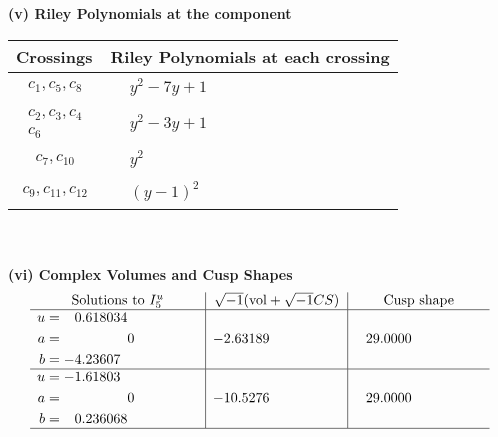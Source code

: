 \documentclass[1p]{elsarticle_modified}
\theoremstyle{definition}
\newcommand{\I}{\sqrt{-1}}
\begin{document}
\newpage\renewcommand{\arraystretch}{1}
\flushleft \textbf{(v) Riley Polynomials at the component}\newline \\
\begin{tabular}{m{50pt}|m{274pt}}
Crossings & \hspace{64pt}Riley Polynomials at each crossing \\
\hline $$\begin{aligned}c_{1},c_{5},c_{8}\end{aligned}$$&$\begin{aligned}
&y^2-7 y+1
\end{aligned}$\\
\hline $$\begin{aligned}c_{2},c_{3},c_{4}\\c_{6}\end{aligned}$$&$\begin{aligned}
&y^2-3 y+1
\end{aligned}$\\
\hline $$\begin{aligned}c_{7},c_{10}\end{aligned}$$&$\begin{aligned}
&y^2
\end{aligned}$\\
\hline $$\begin{aligned}c_{9},c_{11},c_{12}\end{aligned}$$&$\begin{aligned}
&(y-1)^2
\end{aligned}$\\
\hline
\end{tabular}\\~\\
\newpage\flushleft \textbf{(vi) Complex Volumes and Cusp Shapes}
$$\begin{array}{c|c|c}  
\text{Solutions to }I^u_{5}& \I (\text{vol} + \sqrt{-1}CS) & \text{Cusp shape}\\
 \hline 
\begin{aligned}
u &= \phantom{-}0.618034\phantom{ +0.000000I} \\
a &= \phantom{-0.000000 } 0 \\
b &= -4.23607\phantom{ +0.000000I}\end{aligned}
 & -2.63189\phantom{ +0.000000I} & \phantom{-}29.0000\phantom{ +0.000000I} \\ \hline\begin{aligned}
u &= -1.61803\phantom{ +0.000000I} \\
a &= \phantom{-0.000000 } 0 \\
b &= \phantom{-}0.236068\phantom{ +0.000000I}\end{aligned}
 & -10.5276\phantom{ +0.000000I} & \phantom{-}29.0000\phantom{ +0.000000I}\\
 \hline 
 \end{array}$$\newpage\newpage\renewcommand{\arraystretch}{1}
\end{document}
